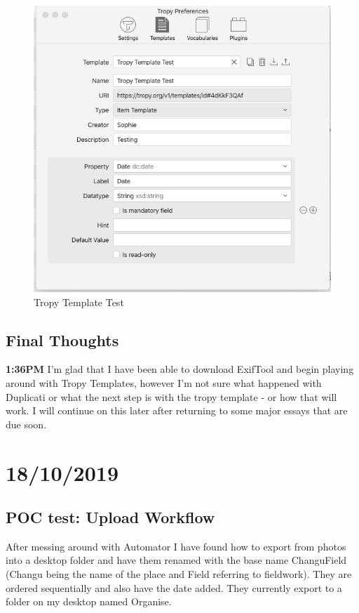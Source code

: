 \documentclass{article}
\begin{document}
\begin{figure} [H]
    \centering
    \includegraphics[width=\textwidth]{Images/TemplateTest_1.png}
    \caption{Tropy Template Test}
    \label{fig:my_label}
\end{figure}


\subsection{Final Thoughts}
\textbf{1:36PM} I'm glad that I have been able to download ExifTool and begin playing around with Tropy Templates, however I'm not sure what happened with Duplicati or what the next step is with the tropy template - or how that will work. I will continue on this later after returning to some major essays that are due soon.

\section{18/10/2019}
\subsection{POC test: Upload Workflow}
After messing around with Automator I have found how to export from photos into a desktop folder and have them renamed with the base name ChanguField (Changu being the name of the place and Field referring to fieldwork). They are ordered sequentially and also have the date added. They currently export to a folder on my desktop named Organise. 
\end{document}
